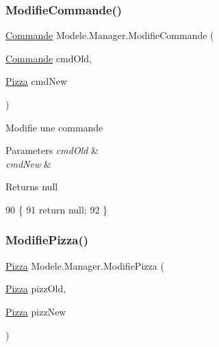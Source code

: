 \subsubsection{\texorpdfstring{Modifie\+Commande()}{ModifieCommande()}}
{\footnotesize\ttfamily \hyperlink{classModele_1_1Commande}{Commande} Modele.\+Manager.\+Modifie\+Commande (\begin{DoxyParamCaption}\item[{\hyperlink{classModele_1_1Commande}{Commande}}]{cmd\+Old,  }\item[{\hyperlink{classModele_1_1Pizza}{Pizza}}]{cmd\+New }\end{DoxyParamCaption})\hspace{0.3cm}{\ttfamily [inline]}}



Modifie une commande 


\begin{DoxyParams}{Parameters}
{\em cmd\+Old} & \\
\hline
{\em cmd\+New} & \\
\hline
\end{DoxyParams}
\begin{DoxyReturn}{Returns}
null
\end{DoxyReturn}

\begin{DoxyCode}
90         \{
91             \textcolor{keywordflow}{return} null;
92         \}
\end{DoxyCode}
\mbox{\label{classModele_1_1Manager_ab9995ba4bcc7203db156eb2096655036}} 
\subsubsection{\texorpdfstring{Modifie\+Pizza()}{ModifiePizza()}}
{\footnotesize\ttfamily \hyperlink{classModele_1_1Pizza}{Pizza} Modele.\+Manager.\+Modifie\+Pizza (\begin{DoxyParamCaption}\item[{\hyperlink{classModele_1_1Pizza}{Pizza}}]{pizz\+Old,  }\item[{\hyperlink{classModele_1_1Pizza}{Pizza}}]{pizz\+New }\end{DoxyParamCaption})\hspace{0.3cm}{\ttfamily [inline]}}



